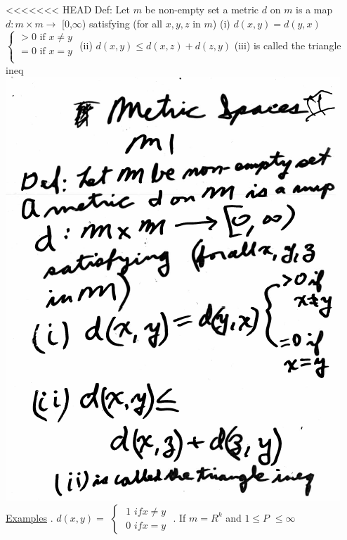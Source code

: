 \documentclass[10pt,a4paper]{article}
\begin{document}
{{<<<<<<< HEAD
Def: Let $m$ be non-empty set a metric $d$ on $m$ is a map
\newline
$d: m \times m \rightarrow$ [0,$\infty$)
\newline
satisfying (for all $x,y,z$ in $m$)
\newline
(i) $d(x,y)=d(y,x)$
$\begin{cases}
>0 \mbox{ if } x \neq y \\
=0 \mbox { if } x=y \\
\end{cases}$
\newline
(ii) $d(x,y)\leq d(x,z)+d(z,y)$
\newline
(iii) is called the triangle ineq
\newline
\includegraphics[scale=.5]{Pages/MS_2_im1}
\newpage
\underline{Examples}
. $d(x,y) =$
$\begin{cases}
\mbox { 1 } if x \neq y \\
\mbox { 0 } if x = y
\end{cases}$
. If $m=R^k$ and $1\leq P$ $\leq \infty$
}}
\end{document}
